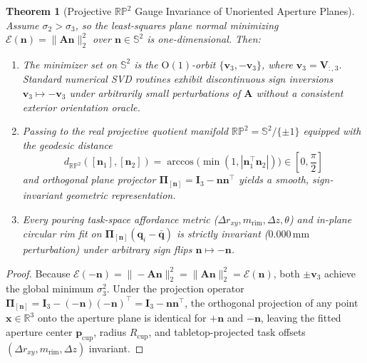 \documentclass[10pt,journal]{IEEEtran}
\newtheorem{theorem}{Theorem}
\begin{document}
\begin{theorem}[Projective $\mathbb{RP}^2$ Gauge Invariance of Unoriented Aperture Planes]
\label{thm:rp2}
Assume $\sigma_2 > \sigma_3$, so the least-squares plane normal minimizing $\mathcal{E}(\mathbf{n}) = \|\mathbf{A}\mathbf{n}\|_2^2$ over $\mathbf{n} \in \mathbb{S}^2$ is one-dimensional. Then:
\begin{enumerate}
    \item The minimizer set on $\mathbb{S}^2$ is the $\mathrm{O}(1)$-orbit $\{\mathbf{v}_3, -\mathbf{v}_3\}$, where $\mathbf{v}_3 = \mathbf{V}_{:,3}$. Standard numerical SVD routines exhibit discontinuous sign inversions $\mathbf{v}_3 \mapsto -\mathbf{v}_3$ under arbitrarily small perturbations of $\mathbf{A}$ without a consistent exterior orientation oracle.
    \item Passing to the real projective quotient manifold $\mathbb{RP}^2 = \mathbb{S}^2 / \{\pm 1\}$ equipped with the geodesic distance
    \begin{equation}
        d_{\mathbb{RP}^2}([\mathbf{n}_1], [\mathbf{n}_2]) = \arccos\!\big(\min(1, |\mathbf{n}_1^\top \mathbf{n}_2|)\big) \in \left[0, \frac{\pi}{2}\right]
        \label{eq:rp2_metric}
    \end{equation}
    and orthogonal plane projector $\boldsymbol{\Pi}_{[\mathbf{n}]} = \mathbf{I}_3 - \mathbf{n}\mathbf{n}^\top$ yields a smooth, sign-invariant geometric representation.
    \item Every pouring task-space affordance metric ($\Delta r_{xy}, m_{\mathrm{rim}}, \Delta z, \theta$) and in-plane circular rim fit on $\boldsymbol{\Pi}_{[\mathbf{n}]}(\mathbf{q}_i - \bar{\mathbf{q}})$ is strictly invariant ($0.000\,\mathrm{mm}$ perturbation) under arbitrary sign flips $\mathbf{n} \mapsto -\mathbf{n}$.
\end{enumerate}
\end{theorem}
\begin{proof}
Because $\mathcal{E}(-\mathbf{n}) = \|-\mathbf{A}\mathbf{n}\|_2^2 = \|\mathbf{A}\mathbf{n}\|_2^2 = \mathcal{E}(\mathbf{n})$, both $\pm\mathbf{v}_3$ achieve the global minimum $\sigma_3^2$. Under the projection operator $\boldsymbol{\Pi}_{[\mathbf{n}]} = \mathbf{I}_3 - (-\mathbf{n})(-\mathbf{n})^\top = \mathbf{I}_3 - \mathbf{n}\mathbf{n}^\top$, the orthogonal projection of any point $\mathbf{x} \in \mathbb{R}^3$ onto the aperture plane is identical for $+\mathbf{n}$ and $-\mathbf{n}$, leaving the fitted aperture center $\mathbf{p}_{\mathrm{cup}}$, radius $R_{\mathrm{cup}}$, and tabletop-projected task offsets $(\Delta r_{xy}, m_{\mathrm{rim}}, \Delta z)$ invariant.
\end{proof}
\end{document}
